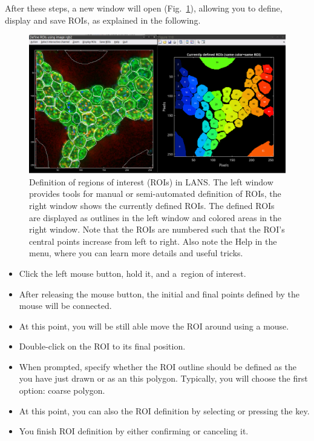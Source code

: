 \goldbox{}
After these steps, a new window will open (Fig.~\ref{fig:roi-definition-tool}), allowing you to define, display and save ROIs, as explained in the following.
\tcbe

\begin{figure}[!ht]
\centering
\includegraphics[width=\textwidth]{figs3/LANS-roi-definition-tool}
\caption{\label{fig:roi-definition-tool}%
Definition of regions of interest (ROIs) in LANS. The left window provides tools for manual or semi-automated definition of ROIs, the right window shows the currently defined ROIs. The defined ROIs are displayed as outlines in the left window and colored areas in the right window. Note that the ROIs are numbered such that the ROI's central points increase from left to right. Also note the Help in the menu, where you can learn more details and useful tricks.}
\end{figure}

\setcounter{step}{0}



\begin{itemize}
\item Click the left mouse button, hold it, and  a~region of interest. 
\item After releasing the mouse button, the initial and final points defined by the mouse will be connected.
\item At this point, you will be still able move the ROI around using a mouse.
\item Double-click on the ROI to  its final position.
\item When prompted, specify whether the ROI outline should be defined as the  you have just drawn or as an  this polygon. Typically, you will choose the first option: coarse polygon. 
\item At this point, you can also  the ROI definition by selecting  or pressing the  key.
\item You  finish ROI definition by either confirming or canceling it.
\end{itemize}
\tcbe

